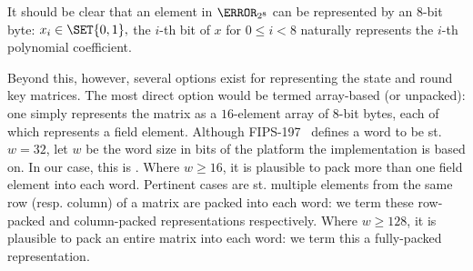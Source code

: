 
It should be clear that an element in $\F_{2^8}$ can be represented by an
$8$-bit byte: 
$
x_i \in \SET{ 0, 1 } ,
$
the $i$-th bit of $x$ for $0 \leq i < 8$ naturally represents the $i$-th 
polynomial coefficient.

Beyond this, however, several options exist for representing the state and
round key matrices.  The most direct option would be termed
 array-based (or unpacked):
one simply represents the matrix as a $16$-element array of $8$-bit bytes, 
each of which represents a field element.
Although FIPS-197~\cite{FIPS:197} defines a word to be st. $w = 32$, let
$w$ be the word size in bits of the platform the implementation is based on.
In our case, this is \RVXLEN.
Where $w \geq  16$,
it is plausible to pack
more than one field element 
into each word.  
Pertinent cases are st. multiple elements from the same row (resp. column) 
of a matrix are packed into each word:
we term these
   row-packed  
and
column-packed
representations respectively.
Where $w \geq 128$, 
it is plausible to pack
an entire matrix
into each word: 
we term this a 
 fully-packed 
representation.

